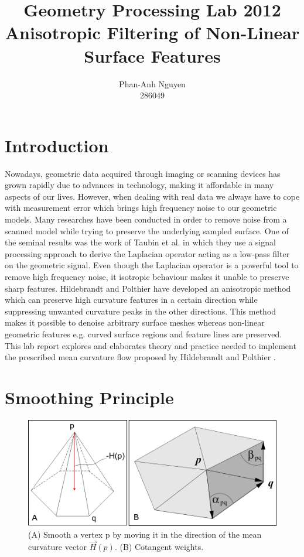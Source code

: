 \documentclass[11pt]{article}
\author{Phan-Anh Nguyen\\
		286049}
\title{Geometry Processing Lab 2012\\
	   Anisotropic Filtering of Non-Linear Surface Features}
\begin{document}
\maketitle



\section{Introduction}

Nowadays, geometric data acquired through imaging or scanning devices has grown rapidly due to advances in technology, making it affordable in many aspects of our lives. However, when dealing with real data we always have to cope with measurement error which brings high frequency noise to our geometric models. Many researches have been conducted in order to remove noise from a scanned model while trying to preserve the underlying sampled surface. One of the seminal results was the work of Taubin et al. \cite{Taubin:1995:SPA:218380.218473} in which they use a signal processing approach to derive the Laplacian operator acting as a low-pass filter on the geometric signal. Even though the Laplacian operator is a powerful tool to remove high frequency noise, it isotropic behaviour makes it unable to preserve sharp features. Hildebrandt and Polthier \cite{Hildebrandt04anisotropicfiltering} have developed an anisotropic method which can preserve high curvature features in a certain direction while suppressing unwanted curvature peaks in the other directions. This method makes it possible to denoise arbitrary surface meshes whereas non-linear geometric features e.g. curved surface regions and feature lines are preserved. This lab report explores and elaborates theory and practice needed to implement the prescribed mean curvature flow proposed by Hildebrandt and Polthier \cite{Hildebrandt04anisotropicfiltering}.

\section{Smoothing Principle}

\begin{figure}[htbp]
    \centering
    \includegraphics[width=\textwidth]{fig12.png}
    \caption{(A) Smooth a vertex p by moving it in the direction of the mean curvature vector $\vec{H}(p)$. (B) Cotangent weights.}
    \label{fig:umbrella}
\end{figure}
\end{document}
